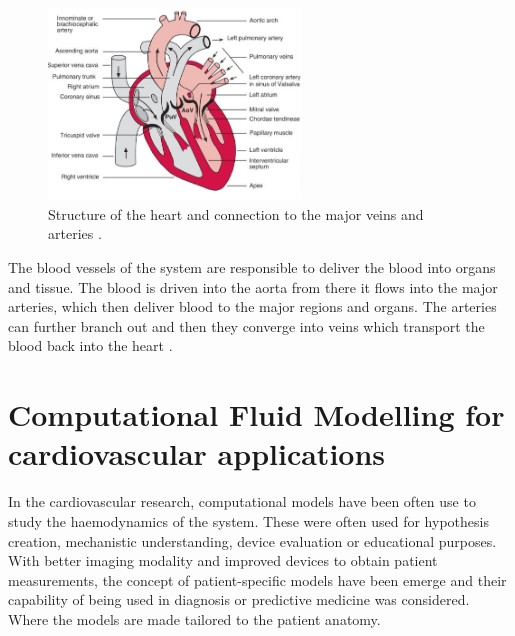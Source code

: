 \begin{figure}[ht!]
  \centering
  \includegraphics[width=0.6\textwidth]{Figures/heart}
  \caption{Structure of the heart and connection to the major veins and arteries \cite{Levick2010Introduction5ed}.}
  \label{fig:heart}
\end{figure}


The blood vessels of the system are responsible to deliver the blood into organs and tissue. The blood is driven into the aorta from there it flows into the major arteries, which then deliver blood to the major regions and organs. The arteries can further branch out and then they converge into veins which transport the blood back into the heart \cite{Levick2010Introduction5ed}.\par

\section{Computational Fluid Modelling for cardiovascular applications}
In the cardiovascular research, computational models have been often use to study the haemodynamics of the system. These were often used for hypothesis creation, mechanistic understanding, device evaluation or educational purposes. With better imaging modality and improved devices to obtain patient measurements, the concept of patient-specific models have been emerge and their capability of being used in diagnosis or predictive medicine was considered. Where the models are made tailored to the patient anatomy.\par

